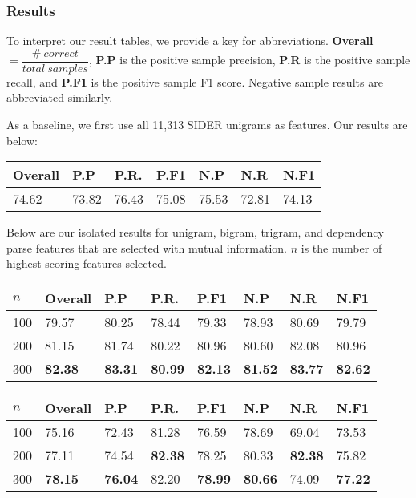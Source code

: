 \documentclass{acm_proc_article-sp}
\begin{document}
\subsubsection{Results}
To interpret our result tables, we provide a key for abbreviations. \textbf{Overall} $= \dfrac{\#\:correct}{total\:samples}$, \textbf{P.P} is the positive sample precision, \textbf{P.R} is the positive sample recall, and \textbf{P.F1} is the positive sample F1 score. Negative sample results are abbreviated similarly. 

As a baseline, we first use all 11,313 SIDER unigrams as features. Our results are below:

\vspace{-3mm}
\tabcolsep=0.11cm
\begin{tabular}{| l | l | l | l | l | l | l |}
\hline
Overall & P.P & P.R. & P.F1 & N.P & N.R & N.F1 \\ \hline
74.62 & 73.82 & 76.43 & 75.08 & 75.53 & 72.81 & 74.13 \\ \hline
\end{tabular} 

Below are our isolated results for unigram, bigram, trigram, and dependency parse features that are selected with mutual information. $n$ is the number of highest scoring features selected. 
\vspace{-3mm}
\tabcolsep=0.11cm
\begin{tabular}{| l | l | l | l | l | l | l | l |}
\hline
$n$ & Overall & P.P & P.R. & P.F1 & N.P & N.R & N.F1 \\ \hline
100 & 79.57 & 80.25 & 78.44 & 79.33 & 78.93 & 80.69 & 79.79 \\ \hline
200 & 81.15 & 81.74 & 80.22 & 80.96 & 80.60 & 82.08 & 80.96 \\ \hline
300 & \bf{82.38} & \bf{83.31} & \bf{80.99} & \bf{82.13} & \bf{81.52} & \bf{83.77} & \bf{82.62} \\ \hline
\end{tabular} 

\vspace{-3mm}
\tabcolsep=0.11cm
\begin{tabular}{| l | l | l | l | l | l | l | l |}
\hline
$n$ & Overall & P.P & P.R. & P.F1 & N.P & N.R & N.F1 \\ \hline
100 & 75.16 & 72.43 & 81.28 & 76.59 & 78.69 & 69.04 & 73.53 \\ \hline
200 & 77.11 & 74.54 & \bf{82.38} & 78.25 & 80.33 & \bf{82.38} & 75.82 \\ \hline
300 & \bf{78.15} & \bf{76.04} & 82.20 & \bf{78.99} & \bf{80.66} & 74.09 & \bf{77.22} \\ \hline
\end{tabular} 
\end{document}
